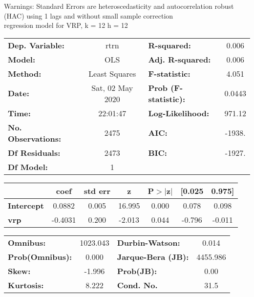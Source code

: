 Warnings: \newline
 [1] Standard Errors are heteroscedasticity and autocorrelation robust (HAC) using 1 lags and without small sample correction\\ 

regression model for VRP, k = 12 h = 12\begin{center}
\begin{tabular}{lclc}
\toprule
\textbf{Dep. Variable:}    &       rtrn       & \textbf{  R-squared:         } &     0.006   \\
\textbf{Model:}            &       OLS        & \textbf{  Adj. R-squared:    } &     0.006   \\
\textbf{Method:}           &  Least Squares   & \textbf{  F-statistic:       } &     4.051   \\
\textbf{Date:}             & Sat, 02 May 2020 & \textbf{  Prob (F-statistic):} &   0.0443    \\
\textbf{Time:}             &     22:01:47     & \textbf{  Log-Likelihood:    } &    971.12   \\
\textbf{No. Observations:} &        2475      & \textbf{  AIC:               } &    -1938.   \\
\textbf{Df Residuals:}     &        2473      & \textbf{  BIC:               } &    -1927.   \\
\textbf{Df Model:}         &           1      & \textbf{                     } &             \\
\bottomrule
\end{tabular}
\begin{tabular}{lcccccc}
                   & \textbf{coef} & \textbf{std err} & \textbf{z} & \textbf{P$> |$z$|$} & \textbf{[0.025} & \textbf{0.975]}  \\
\midrule
\textbf{Intercept} &       0.0882  &        0.005     &    16.995  &         0.000        &        0.078    &        0.098     \\
\textbf{vrp}       &      -0.4031  &        0.200     &    -2.013  &         0.044        &       -0.796    &       -0.011     \\
\bottomrule
\end{tabular}
\begin{tabular}{lclc}
\textbf{Omnibus:}       & 1023.043 & \textbf{  Durbin-Watson:     } &    0.014  \\
\textbf{Prob(Omnibus):} &   0.000  & \textbf{  Jarque-Bera (JB):  } & 4455.986  \\
\textbf{Skew:}          &  -1.996  & \textbf{  Prob(JB):          } &     0.00  \\
\textbf{Kurtosis:}      &   8.222  & \textbf{  Cond. No.          } &     31.5  \\
\bottomrule
\end{tabular}
\end{center}

